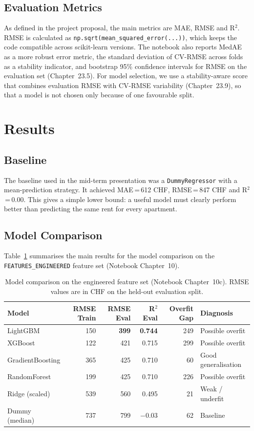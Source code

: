 \documentclass[11pt,a4paper]{article}
\begin{document}
\subsection{Evaluation Metrics}
As defined in the project proposal, the main metrics are MAE, RMSE and R$^2$. RMSE is calculated as \texttt{np.sqrt(mean\_squared\_error(...))}, which keeps the code compatible across scikit-learn versions. The notebook also reports MedAE as a more robust error metric, the standard deviation of CV-RMSE across folds as a stability indicator, and bootstrap 95\% confidence intervals for RMSE on the evaluation set (Chapter~23.5). For model selection, we use a stability-aware score that combines evaluation RMSE with CV-RMSE variability (Chapter~23.9), so that a model is not chosen only because of one favourable split.

\section{Results}
\label{sec:results}

\subsection{Baseline}
The baseline used in the mid-term presentation was a \texttt{DummyRegressor} with a mean-prediction strategy. It achieved MAE\,=\,612 CHF, RMSE\,=\,847 CHF and R$^2$\,=\,0.00. This gives a simple lower bound: a useful model must clearly perform better than predicting the same rent for every apartment.

\subsection{Model Comparison}
Table~\ref{tab:models} summarises the main results for the model comparison on the \texttt{FEATURES\_ENGINEERED} feature set (Notebook Chapter~10).

\begin{table}[h]
\centering
\small
\caption{Model comparison on the engineered feature set (Notebook Chapter~10c). RMSE values are in CHF on the held-out evaluation split.}
\label{tab:models}
\begin{tabular}{lrrrrl}
\toprule
Model & RMSE Train & RMSE Eval & R$^2$ Eval & Overfit Gap & Diagnosis \\
\midrule
LightGBM         & 150  & \textbf{399} & \textbf{0.744} & 249 & Possible overfit \\
XGBoost          & 122  & 421 & 0.715 & 299 & Possible overfit \\
GradientBoosting & 365  & 425 & 0.710 &  60 & Good generalisation \\
RandomForest     & 199  & 425 & 0.710 & 226 & Possible overfit \\
Ridge (scaled)   & 539  & 560 & 0.495 &  21 & Weak / underfit \\
Dummy (median)   & 737  & 799 & $-0.03$ & 62 & Baseline \\
\bottomrule
\end{tabular}
\end{table}
\end{document}
